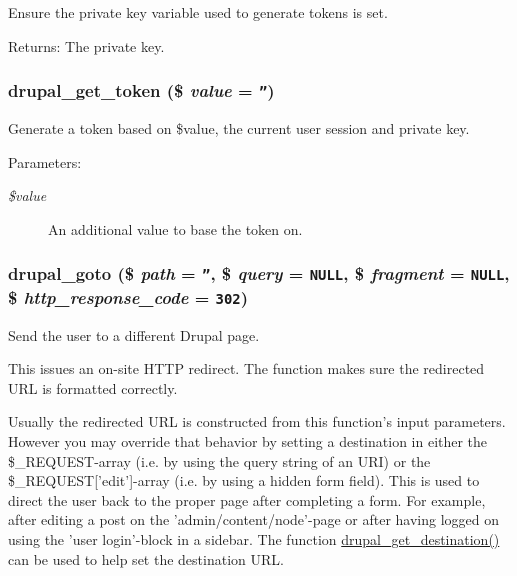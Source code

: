 Ensure the private key variable used to generate tokens is set.

\begin{Desc}
\item[Returns:]The private key. \end{Desc}
\hypertarget{common_8inc_16989177d9fa05df9b45e8797ce04994}{
\subsubsection[{drupal\_\-get\_\-token}]{\setlength{\rightskip}{0pt plus 5cm}drupal\_\-get\_\-token (\$ {\em value} = {\tt ''})}}
\label{common_8inc_16989177d9fa05df9b45e8797ce04994}


Generate a token based on \$value, the current user session and private key.

\begin{Desc}
\item[Parameters:]
\begin{description}
\item[{\em \$value}]An additional value to base the token on. \end{description}
\end{Desc}
\hypertarget{common_8inc_74b81f841dbbac5a119a9cc7e3ffc614}{
\subsubsection[{drupal\_\-goto}]{\setlength{\rightskip}{0pt plus 5cm}drupal\_\-goto (\$ {\em path} = {\tt ''}, \/  \$ {\em query} = {\tt NULL}, \/  \$ {\em fragment} = {\tt NULL}, \/  \$ {\em http\_\-response\_\-code} = {\tt 302})}}
\label{common_8inc_74b81f841dbbac5a119a9cc7e3ffc614}


Send the user to a different Drupal page.

This issues an on-site HTTP redirect. The function makes sure the redirected URL is formatted correctly.

Usually the redirected URL is constructed from this function's input parameters. However you may override that behavior by setting a destination in either the \$\_\-REQUEST-array (i.e. by using the query string of an URI) or the \$\_\-REQUEST\mbox{[}'edit'\mbox{]}-array (i.e. by using a hidden form field). This is used to direct the user back to the proper page after completing a form. For example, after editing a post on the 'admin/content/node'-page or after having logged on using the 'user login'-block in a sidebar. The function \hyperlink{common_8inc_0c95c16e75ac4df882686daccc1f8ac5}{drupal\_\-get\_\-destination()} can be used to help set the destination URL.

